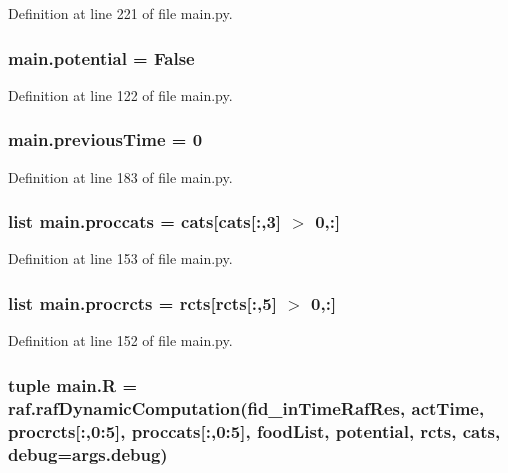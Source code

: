 Definition at line 221 of file main.\-py.

\hypertarget{a00117_abe4c267a63409b1b7cd9c6aaf0779b4a}{
\subsubsection[{potential}]{\setlength{\rightskip}{0pt plus 5cm}main.\-potential = False}}\label{a00117_abe4c267a63409b1b7cd9c6aaf0779b4a}


Definition at line 122 of file main.\-py.

\hypertarget{a00117_a6a6de947e3b6ada5ea6e761d208228bd}{
\subsubsection[{previous\-Time}]{\setlength{\rightskip}{0pt plus 5cm}main.\-previous\-Time = 0}}\label{a00117_a6a6de947e3b6ada5ea6e761d208228bd}


Definition at line 183 of file main.\-py.

\hypertarget{a00117_a4e3c4b627d098aef6c7905cb20683e07}{
\subsubsection[{proccats}]{\setlength{\rightskip}{0pt plus 5cm}list main.\-proccats = {\bf cats}\mbox{[}{\bf cats}\mbox{[}\-:,3\mbox{]} $>$ 0,\-:\mbox{]}}}\label{a00117_a4e3c4b627d098aef6c7905cb20683e07}


Definition at line 153 of file main.\-py.

\hypertarget{a00117_a2120e8355b3501aed0114a74091d56c1}{
\subsubsection[{procrcts}]{\setlength{\rightskip}{0pt plus 5cm}list main.\-procrcts = {\bf rcts}\mbox{[}{\bf rcts}\mbox{[}\-:,5\mbox{]} $>$ 0,\-:\mbox{]}}}\label{a00117_a2120e8355b3501aed0114a74091d56c1}


Definition at line 152 of file main.\-py.

\hypertarget{a00117_aa51f04a64cdea4fbde3c2d484d06d443}{
\subsubsection[{R}]{\setlength{\rightskip}{0pt plus 5cm}tuple main.\-R = raf.\-raf\-Dynamic\-Computation({\bf fid\-\_\-in\-Time\-Raf\-Res}, {\bf act\-Time}, {\bf procrcts}\mbox{[}\-:,0\-:5\mbox{]}, {\bf proccats}\mbox{[}\-:,0\-:5\mbox{]}, {\bf food\-List}, {\bf potential}, {\bf rcts}, {\bf cats}, debug=args.\-debug)}}\label{a00117_aa51f04a64cdea4fbde3c2d484d06d443}


